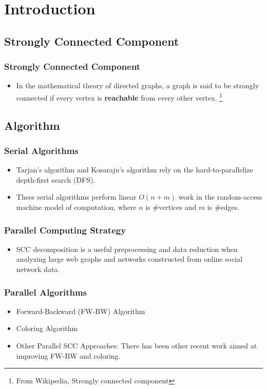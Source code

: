 \section{Introduction}

\subsection{Strongly Connected Component}
\begin{frame}
    \frametitle{Strongly Connected Component}
	\begin{itemize}
		\item In the mathematical theory of directed graphs, a graph 
			is said to be strongly connected if every vertex is 
			\textbf{reachable} from every other vertex.
			\footnote{From Wikipedia, Strongly connected component}
	\end{itemize}
\end{frame}

\subsection{Algorithm}
\begin{frame}
	\frametitle{Serial Algorithms}
	\begin{itemize}
		\setlength\itemsep{1em}
		\item Tarjan's algorithm and Kosaraju's algorithm rely on 
			the hard-to-parallelize depth-first search (DFS). 
		\item These serial algorithms perform linear $O(n + m)$
			work in the random-access machine model of computation,
			where $n$ is \#vertices and $m$ is \#edges.
	\end{itemize}
\end{frame}

\begin{frame}
	\frametitle{Parallel Computing Strategy}
	\begin{itemize}
		\setlength\itemsep{1em}
		\item SCC decomposition is a useful preprocessing and data 
			reduction when analyzing large web graphs and networks
			constructed from online social network data.
	\end{itemize}
\end{frame}

\begin{frame}
	\frametitle{Parallel Algorithms}
	\begin{itemize}
		\setlength\itemsep{1em}
		\item Forward-Backward (FW-BW) Algorithm
		\item Coloring Algorithm
		\item Other Parallel SCC Approaches: There has been other 
			recent work aimed at improving FW-BW and coloring.
	\end{itemize}
\end{frame}


